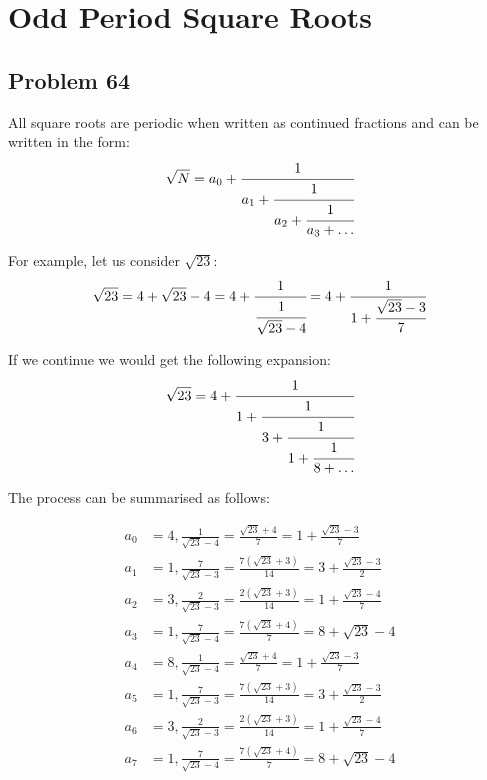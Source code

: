 \section{Odd Period Square Roots}
\subsection{Problem 64}

All square roots are periodic when written as continued fractions and can be written in the form:
\begin{equation*}
	\sqrt{N} = a_0 + \cfrac{1}{a_1 + \cfrac{1}{a_2 + \cfrac{1}{a_3 + \dots}}}
\end{equation*}

For example, let us consider \( \sqrt{23} \):
\begin{equation*}
	\sqrt{23} = 4 + \sqrt{23} - 4 = 4 + \cfrac{1}{\cfrac{1}{\sqrt{23}-4}} = 4 + \cfrac{1}{1 + \cfrac{\sqrt{23} - 3}{7}}
\end{equation*}

If we continue we would get the following expansion:
\begin{equation*}
	\sqrt{23} = 4 + \cfrac{1}{1 + \cfrac{1}{3 + \cfrac{1}{1 + \cfrac{1}{8 + \dots}}}}
\end{equation*}

The process can be summarised as follows:

\begin{align*}
	a_0 & = 4, \frac{1}{\sqrt{23} - 4}  = \frac{\sqrt{23} + 4}{7}      = 1 + \frac{\sqrt{23} -3}{7} \\
	a_1 & = 1, \frac{7}{\sqrt{23} - 3}  = \frac{7(\sqrt{23} + 3)}{14}  = 3 + \frac{\sqrt{23} -3}{2} \\
	a_2 & = 3, \frac{2}{\sqrt{23} - 3}  = \frac{2(\sqrt{23} + 3)}{14}  = 1 + \frac{\sqrt{23} -4}{7} \\
	a_3 & = 1, \frac{7}{\sqrt{23} - 4}  = \frac{7(\sqrt{23} + 4)}{7}   = 8 + {\sqrt{23} -4}         \\
	a_4 & = 8, \frac{1}{\sqrt{23} - 4}  = \frac{\sqrt{23} + 4}{7}      = 1 + \frac{\sqrt{23} -3}{7} \\
	a_5 & = 1, \frac{7}{\sqrt{23} - 3}  = \frac{7(\sqrt{23} + 3)}{14}  = 3 + \frac{\sqrt{23} -3}{2} \\
	a_6 & = 3, \frac{2}{\sqrt{23} - 3}  = \frac{2(\sqrt{23} + 3)}{14}  = 1 + \frac{\sqrt{23} -4}{7} \\
	a_7 & = 1, \frac{7}{\sqrt{23} - 4}  = \frac{7(\sqrt{23} + 4)}{7}   = 8 + {\sqrt{23} -4}         \\
\end{align*}

